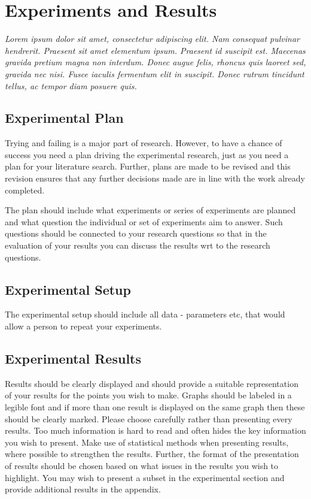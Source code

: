 \documentclass[a4paper]{book}
\begin{document}
\chapter{Experiments and Results}
\label{cha:ResearchAndResults}

{\it Lorem ipsum dolor sit amet, consectetur adipiscing elit. Nam consequat pulvinar hendrerit. Praesent sit amet elementum ipsum. Praesent id suscipit est. Maecenas gravida pretium magna non interdum. Donec augue felis, rhoncus quis laoreet sed, gravida nec nisi. Fusce iaculis fermentum elit in suscipit. Donec rutrum tincidunt tellus, ac tempor diam posuere quis. }

\section{Experimental Plan}
\label{sec:experimentalPlan}

Trying and failing is a major part of research. However, to have a chance of success you need a plan driving the experimental research, just as you need a plan for your literature search. Further, plans are made to be revised and this revision ensures that any further decisions made are in line with the work already completed.  

The plan should include what experiments or series of experiments are planned and what question the individual or set of experiments aim to answer. Such questions should be connected to your research questions so that in the evaluation of your results you can discuss the results wrt to the research questions.  

\section{Experimental Setup}
\label{sec:experimentalSetup}

The experimental setup should include all data - parameters etc, that would allow a person to repeat your experiments. 

\section{Experimental Results}
\label{sec:experimentalResults}

Results should be clearly displayed and should provide a suitable representation of your results for the points you wish to make. Graphs should be labeled in a legible font and if more than one result is displayed on the same graph then these should be clearly marked.   Please choose carefully rather than presenting every results. Too much information is hard to read and often hides the key information you wish to present. Make use of statistical methods when presenting results, where possible to strengthen the results.  Further, the format of the presentation of results should be chosen based on what issues in the results you wish to highlight. You may wish to present a subset in the experimental section and provide additional results in the appendix.
\end{document}
